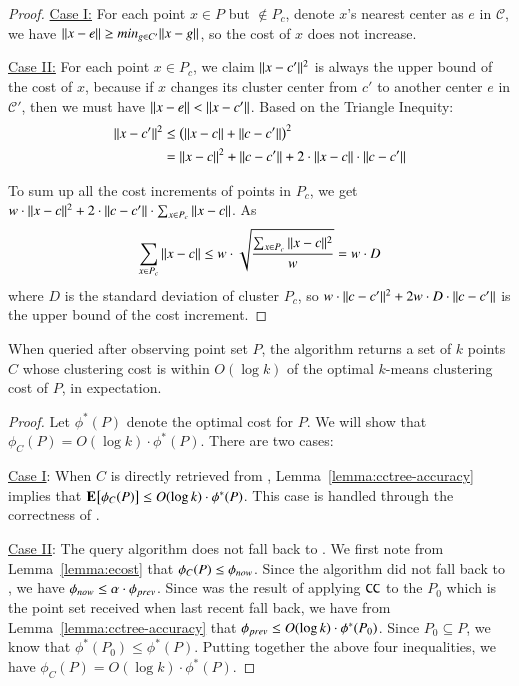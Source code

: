 {\begin{proof}
\underline{Case I:}  For each point $x \in P$ but $\notin P_c$,  denote $x$'s nearest center as $e$ in $\mathcal{C}$, we have $\Arrowvert {x} - {e} \Arrowvert \geq min_{g \in C'} \Arrowvert {x} - {g} \Arrowvert$, so the \km cost of $x$ does not increase.

\underline{Case II:} For each point $x \in P_c$, we claim $\Arrowvert {x} - {c'} \Arrowvert^2$ is always the upper bound of the \km cost of $x$,
because if $x$ changes its cluster center from $c'$ to another center $e$ in $\mathcal{C}'$, then we must have $\Arrowvert {x} - {e} \Arrowvert < \Arrowvert {x} - {c'} \Arrowvert$. Based on the Triangle Inequity: 
\begin{align*}
\Arrowvert {x} - {c'} \Arrowvert^2 & \leq \left( \Arrowvert {x} - {c} \Arrowvert + \Arrowvert {c} - {c'} \Arrowvert  \right)^2 \\
					  &= \Arrowvert {x} - {c} \Arrowvert^2 + \Arrowvert {c} - {c'} \Arrowvert + 2 \cdot \Arrowvert {x} - {c} \Arrowvert \cdot \Arrowvert {c} - {c'} \Arrowvert
\end{align*}

To sum up all the \km cost increments of points in $P_c$, we get $w \cdot \Arrowvert {x} - {c} \Arrowvert^2 + 2 \cdot \Arrowvert {c} - {c'} \Arrowvert \cdot \sum_{x \in P_c} \Arrowvert {x} - {c} \Arrowvert$. As
\[
\sum_{x \in P_c} \Arrowvert {x} - {c} \Arrowvert \leq w \cdot \sqrt{\frac{ \sum_{x \in P_c} \Arrowvert {x} - {c} \Arrowvert^2}{w}} = w \cdot D
\]
where $D$ is the standard deviation of cluster $P_c$, so $w \cdot \Arrowvert {c} - {c'} \Arrowvert^2 + 2w \cdot D \cdot \Arrowvert {c} - {c'} \Arrowvert$ is the upper bound of the \km cost increment.
\end{proof}
}

\begin{lemma}
\label{lemma:online}
When queried after observing point set $P$, the \hybrid algorithm returns a set of $k$ points $C$ whose clustering cost is within $O(\log k)$ of the optimal $k$-means clustering cost of $P$, in expectation.
\end{lemma}

\begin{proof}
  Let $\phi^*(P)$ denote the optimal \km cost for $P$. We will show that
  $\phi_C(P) = O(\log k) \cdot \phi^*(P)$. There are two cases:

  \noindent{}\underline{Case I}: When $C$ is directly retrieved from \cc, 
  Lemma~\ref{lemma:cctree-accuracy} implies that
  $\mathop{\text{\normalfont \textbf{E}}}_{{}}\!\left[\phi_{C}(P)\right] \leq O(\log k) \cdot \phi^* (P)$. This case is handled
  through the correctness of \cc.

  \noindent{}\underline{Case II}:
  The query algorithm does not fall back to \cc. We first note from
  Lemma~\ref{lemma:ecost} that $\phi_C(P) \le \texttt{$\phi_{now}$}$. Since the algorithm did
  not fall back to \cc, we have $\texttt{$\phi_{now}$} \leq \alpha \cdot \texttt{$\phi_{prev}$}$. Since
  \fallbackcost was the result of applying $\texttt{CC}$ to the $P_0$ which is the point set received when last recent fall back, 
  we have from Lemma~\ref{lemma:cctree-accuracy} that
  $\texttt{$\phi_{prev}$} \leq O(\log k) \cdot \phi^*(P_0)$. Since $P_0 \subseteq P$, we know
  that $\phi^*(P_0) \leq \phi^*(P)$. Putting together the above four
  inequalities, we have $\phi_C(P) = O(\log k) \cdot \phi^*(P)$.  
\end{proof}
